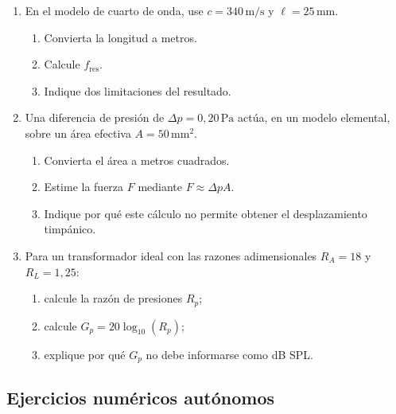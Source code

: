 \begin{enumerate}[label=\textbf{G\arabic*.},leftmargin=*]
    \item En el modelo de cuarto de onda, use
    \(c=340\,\text{m}/\text{s}\) y
    \(\ell=25\,\text{mm}\).
    \begin{enumerate}[label=\alph*)]
        \item Convierta la longitud a metros.
        \item Calcule \(f_\mathrm{res}\).
        \item Indique dos limitaciones del resultado.
    \end{enumerate}

    \item Una diferencia de presión de
    \(\Delta p=0{,}20\,\text{Pa}\) actúa, en un modelo elemental, sobre un
    área efectiva \(A=50\,\text{mm}^2\).
    \begin{enumerate}[label=\alph*)]
        \item Convierta el área a metros cuadrados.
        \item Estime la fuerza \(F\) mediante
        \(F\approx\Delta pA\).
        \item Indique por qué este cálculo no permite obtener el
        desplazamiento timpánico.
    \end{enumerate}

    \item Para un transformador ideal con las razones adimensionales
    \(R_A=18\) y \(R_L=1{,}25\):
    \begin{enumerate}[label=\alph*)]
        \item calcule la razón de presiones \(R_p\);
        \item calcule \(G_p=20\log_{10}(R_p)\);
        \item explique por qué \(G_p\) no debe informarse como dB SPL.
    \end{enumerate}
\end{enumerate}

\subsection*{Ejercicios numéricos autónomos}

